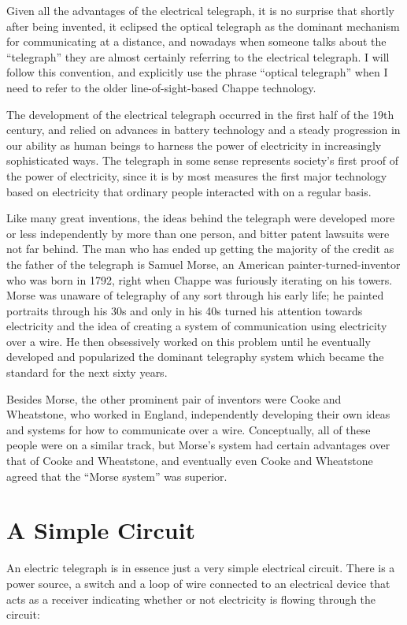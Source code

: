 \documentclass[UTF8]{book}
\begin{document}
\begin{CJK}{UTF8}{gbsn}
Given all the advantages of the electrical telegraph, it is no surprise that shortly after being invented, it eclipsed the optical telegraph as the dominant mechanism for communicating at a distance, and nowadays when someone talks about the ``telegraph'' they are almost certainly referring to the electrical telegraph. I will follow this convention, and explicitly use the phrase ``optical telegraph'' when I need to refer to the older line-of-sight-based Chappe technology.

The development of the electrical telegraph occurred in the first half of the 19th century, and relied on advances in battery technology and a steady progression in our ability as human beings to harness the power of electricity in increasingly sophisticated ways. The telegraph in some sense represents society's first proof of the power of electricity, since it is by most measures the first major technology based on electricity that ordinary people interacted with on a regular basis.

Like many great inventions, the ideas behind the telegraph were developed more or less independently by more than one person, and bitter patent lawsuits were not far behind. The man who has ended up getting the majority of the credit as the father of the telegraph is Samuel Morse, an American painter-turned-inventor who was born in 1792, right when Chappe was furiously iterating on his towers. Morse was unaware of telegraphy of any sort through his early life; he painted portraits through his 30s and only in his 40s turned his attention towards electricity and the idea of creating a system of communication using electricity over a wire. He then obsessively worked on this problem until he eventually developed and popularized the dominant telegraphy system which became the standard for the next sixty years.

Besides Morse, the other prominent pair of inventors were Cooke and Wheatstone, who worked in England, independently developing their own ideas and systems for how to communicate over a wire. Conceptually, all of these people were on a similar track, but Morse's system had certain advantages over that of Cooke and Wheatstone, and eventually even Cooke and Wheatstone agreed that the ``Morse system'' was superior.

\section{A Simple Circuit}

An electric telegraph is in essence just a very simple electrical circuit. There is a power source, a switch and a loop of wire connected to an electrical device that acts as a receiver indicating whether or not electricity is flowing through the circuit:


\end{CJK}
\end{document}
